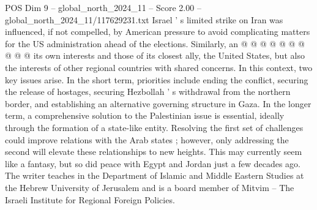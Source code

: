 \begin{textsample}{POS Dim 9 – global\_north\_2024\_11 – Score 2.00 – global\_north\_2024\_11/117629231.txt}
Israel ' s limited strike on Iran was influenced, if not compelled, by American pressure to avoid complicating matters for the US administration ahead of the elections.
Similarly, an @ @ @ @ @ @ @ @ @ @ its own interests and those of its closest ally, the United States, but also the interests of other regional countries with shared concerns.
In this context, two key issues arise.
In the short term, priorities include ending the conflict, securing the release of hostages, securing Hezbollah ' s withdrawal from the northern border, and establishing an alternative governing structure in Gaza.
In the longer term, a comprehensive solution to the Palestinian issue is essential, ideally through the formation of a state-like entity.
Resolving the first set of challenges could improve relations with the Arab states ; however, only addressing the second will elevate these relationships to new heights.
This may currently seem like a fantasy, but so did peace with Egypt and Jordan just a few decades ago.
The writer teaches in the Department of Islamic and Middle Eastern Studies at the Hebrew University of Jerusalem and is a board member of Mitvim -- The Israeli Institute for Regional Foreign Policies.

\end{textsample}
